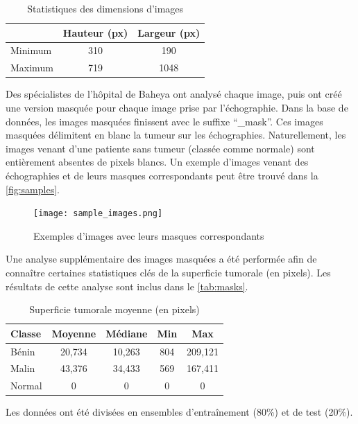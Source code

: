 \documentclass[a4paper,12pt]{article}
\begin{document}
\begin{table}[h]
    \centering
    \caption{Statistiques des dimensions d'images}
    \begin{tabular}{lcc}
        \toprule
        & Hauteur (px) & Largeur (px) \\
        \midrule
        Minimum & 310 & 190 \\
        Maximum & 719 & 1048 \\
        \bottomrule
    \end{tabular}
    \label{tab:dimensions}
\end{table}

\break
Des spécialistes de l'hôpital de Baheya ont analysé chaque image, puis ont créé une version masquée pour chaque image prise par l'échographie. Dans la base de données, les images masquées finissent avec le suffixe \enquote{\_mask}. Ces images masquées délimitent en blanc la tumeur sur les échographies. Naturellement, les images venant d'une patiente sans tumeur (classée comme normale) sont entièrement absentes de pixels blancs. Un exemple d'images venant des échographies et de leurs masques correspondants peut être trouvé dans la \autoref{fig:samples}.

\begin{figure}[h]
    \centering
    \texttt{[image: sample\_images.png]}
    \caption{Exemples d'images avec leurs masques correspondants}
    \label{fig:samples}
\end{figure}

Une analyse supplémentaire des images masquées a été performée afin de connaître certaines statistiques clés de la superficie tumorale (en pixels). Les résultats de cette analyse sont inclus dans le \autoref{tab:masks}.

\begin{table}[h]
    \centering
    \caption{Superficie tumorale moyenne (en pixels)}
    \begin{tabular}{lcccc}
        \toprule
        Classe & Moyenne & Médiane & Min & Max \\
        \midrule
        Bénin & 20,734 & 10,263 & 804 & 209,121 \\
        Malin & 43,376 & 34,433 & 569 & 167,411 \\
        Normal & 0 & 0 & 0 & 0 \\
        \bottomrule
    \end{tabular}
    \label{tab:masks}
\end{table}

Les données ont été divisées en ensembles d'entraînement (80\%) et de test (20\%).
\end{document}

